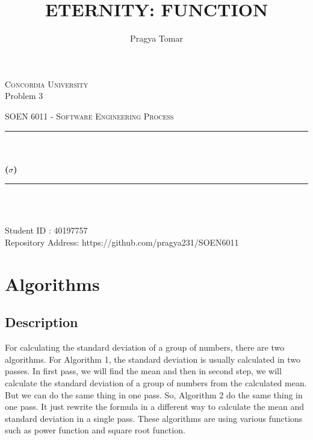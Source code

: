 \documentclass[11pt]{report}
\title{ETERNITY: FUNCTION}
\author{Pragya Tomar}
\date{}
\makeatletter
\let\thetitle\@title
\let\theauthor\@author
\makeatother
\begin{document}
\begin{titlepage}
	\centering
    \vspace*{1 cm}
\begin{center}    \textsc{\Large Concordia University}\\[2.5 cm]	
{Problem 3 }\\[0.4 cm]
\end{center}
	\textsc{\Large  SOEN 6011 - Software Engineering Process }\\[1 cm]
	\rule{\linewidth}{0.5 mm} \\[0.4 cm]
	{ \huge \textbf \thetitle}\\[0.5 cm]
	{ \huge \textbf{($\sigma$)}}
	\rule{\linewidth}{0.5 mm} \\[1.0 cm]

	
\begin{center}   {\Large \textbf{\theauthor}} \\[1 cm]
                 {\large Student ID : 40197757 }\\[0.4 cm]
                 {\large Repository Address: https://github.com/pragya231/SOEN6011}
\end{center}
	
\end{titlepage}

\tableofcontents
\pagebreak

\renewcommand{\thesection}{\arabic{section}}


\section{\Large \vspace{0.2 cm}Algorithms}

\subsection{\Large \vspace{0.2 cm}Description}
For calculating the standard deviation of a group of numbers, there are two algorithms. For Algorithm 1, the standard deviation is usually calculated in two passes. In first pass, we will find the mean and then in second step, we will calculate the standard deviation of a group of numbers from the calculated mean. 
But we can do the same thing in one pass. So, Algorithm 2 do the same thing in one pass. It just rewrite the formula in a different way to calculate the mean and standard deviation in a single pass.
These algorithms are using various functions such as power function and square root function.
\end{document}
